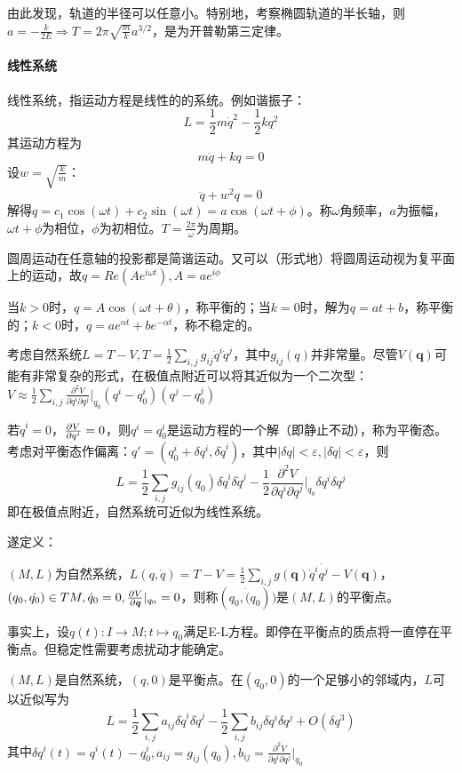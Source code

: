 \documentclass{ctexbook}
\begin{document}
由此发现，轨道的半径可以任意小。特别地，考察椭圆轨道的半长轴，则$a=-\frac{k}{2E}\Rightarrow T=2\pi\sqrt{\frac{m}{k}}a^{3/2}$，是为开普勒第三定律。

\paragraph{线性系统}
线性系统，指运动方程是线性的的系统。例如谐振子：
\[L=\frac{1}{2}m\dot{q}^{2}-\frac{1}{2}kq^{2}\]
其运动方程为
\[m\ddot{q}+kq=0\]
设$w=\sqrt{\frac k m}$：
\[\ddot{q}+w^{2}q=0\]
解得$q=c_{1}\cos(\omega t)+c_{2}\sin(\omega t)=a\cos(\omega t+\phi)$。称$\omega$角频率，$a$为振幅，$\omega t+\phi$为相位，$\phi$为初相位。$T=\frac{2\pi}{\omega}$为周期。

圆周运动在任意轴的投影都是简谐运动。又可以（形式地）将圆周运动视为复平面上的运动，故$q=Re(Ae^{i\omega t}), A=ae^{i\phi}$

当$k>0$时，$q=A\cos(\omega t+\theta)$，称平衡的；当$k=0$时，解为$q=at+b$，称平衡的；$k<0$时，$q=ae^{\alpha t}+be^{-\alpha t}$，称不稳定的。

考虑自然系统$L=T-V, T=\frac{1}{2}\sum_{i,j}g_{ij}\dot{q}^{i}\dot{q}^{j}$，其中$g_{ij}(q)$并非常量。尽管$V(\bm{q})$可能有非常复杂的形式，在极值点附近可以将其近似为一个二次型：$V\approx \frac{1}{2}\sum_{i,j}\frac{\partial^{2}V}{\partial q^{i}\partial q^{j}}|_{q_{0}}(q^{i}-q_{0}^{i})(q^{j}-q_{0}^{j})$

若$\dot q^{i}=0$，$\frac{\partial V}{\partial q^{i}}=0$，则$q^{i}=q_{0}^{i}$是运动方程的一个解（即静止不动），称为平衡态。考虑对平衡态作偏离：$q'=(q_{0}^{i}+\delta q^{i}, \delta\dot{q}^{i})$，其中$|\delta q|<\varepsilon, |\delta \dot q|<\varepsilon$，则
\[L=\frac{1}{2}\sum_{i,j}g_{ij}(q_{0})\delta \dot{q}^{i}\delta \dot{q}^{j}-\frac{1}{2}\frac{\partial^{2}V}{\partial q^{i}\partial q^{j}}|_{q_{0}}\delta q^{i}\delta q^{j}\]
即在极值点附近，自然系统可近似为线性系统。

遂定义：
\begin{Def}
  $(M,L)$为自然系统，$L(q,\dot q)=T-V=\frac{1}{2}\sum_{i,j}g(\bm q)\dot q^{i}\dot{q^{j}}-V(\bm q)$，$(q_{0},\dot{q_{0}})\in TM, \dot{q}_{0}=0, \frac{\partial V}{\partial \bm q}|_{q_{0}}=0$，则称$(q_{0},\dot(q_{0}))$是$(M,L)$的平衡点。
\end{Def}
事实上，设$q(t):I\to M; t\mapsto q_{0}$满足E-L方程。即停在平衡点的质点将一直停在平衡点。但稳定性需要考虑扰动才能确定。

\begin{Prop}
  $(M,L)$是自然系统，$(q,0)$是平衡点。在$(q_{0},0)$的一个足够小的邻域内，$L$可以近似写为
  \[L=\frac{1}{2}\sum_{i,j}a_{ij}\delta \dot{q}^{i}\delta\dot{q}^{j}-\frac{1}{2}\sum_{i,j}b_{ij}\delta q^{i}\delta q^{j}+O(\delta q^{3})\]
  其中$\delta q^{i}(t)=q^{i}(t)-q_{0}^{i}, a_{ij}=g_{ij}(q_{0}),b_{ij}=\frac{\partial^{2}V}{\partial q^{i}\partial q^{j}}|_{q_{0}}$
\end{Prop}
\end{document}

